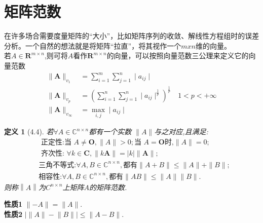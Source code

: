 \documentclass{sintefbeamer}[dark]
\newtheorem*{定义}{定义}
\begin{document}
\section{矩阵范数}
\begin{frame}
在许多场合需要度量矩阵的“大小”，比如矩阵序列的收敛、解线性方程组时的误差分析。一个自然的想法就是将矩阵“拉直”，将其视作一个$mxn$维的向量。\\
若$A\in\mathbf{R}^{m\times n}$,则可将$A$看作$\mathbf{R}^{m\times n}$的向量，可以按照向量范数三公理来定义它的向量范数
\begin{equation*}
	\begin{aligned}
		\parallel\boldsymbol{A}\parallel_{v_1}&=\sum_{i=1}^m\sum_{j=1}^n\mid a_{ij}\mid\\
		\parallel\boldsymbol{A}\parallel_{v_p}&=(\sum_{i=1}^n\sum_{j=1}^n\mid a_{ij}\mid^{\frac1p})^{\frac1p}\quad1<p<+\infty\\
		\parallel\boldsymbol{A}\parallel_{v_\infty}&=\max_{i,j}\mid a_{ij}\mid
	\end{aligned}
\end{equation*}
\end{frame}

\begin{frame}
	\begin{定义}[4.4]
	若$\forall A\in\mathbb{C}^{n\times n}$都有一个实数 $\parallel A\parallel$与之对应,且满足:
	\begin{equation*}
		\begin{aligned}
			&\text{ 正定性:当 }A\neq\boldsymbol{O},\parallel A\parallel>0;\text{当 }A=\boldsymbol{O}\text{时,}\parallel A\parallel=0;\\
			&\text{ 齐次性: }\forall k\in\mathbf{C},\parallel k\mathbf{A}\parallel=\mid k\mid\parallel\mathbf{A}\parallel;\\
			&\text{三角不等式:}\forall A,B\in\mathbb{C}^{n\times n},\text{都有}\parallel A+B\parallel\leqslant\|A\parallel+\|B\parallel;\\
			&\text{相容性:}\forall A,B\in\mathbb{C}^{n\times n},\text{都有}\parallel AB\parallel\leqslant\|A\parallel\|B\parallel.
		\end{aligned}
	\end{equation*}
	则称$\left\|A\right\|$为$ C^{n\times n}$上矩阵$A$的矩阵范数.\\
\end{定义}
	\pause
	\textbf{性质1} \qquad $\parallel-A\parallel=\parallel A\parallel.$\\
	\textbf{性质2} \qquad $\mid\lVert A\rVert-\lVert B\rVert\mid\leqslant\lVert A-B\rVert.$
\end{frame}
\end{document}

